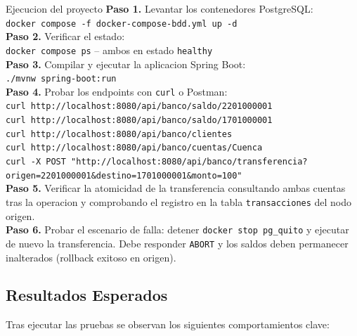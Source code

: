 \documentclass[11pt,a4paper]{article}
\begin{document}
\begin{practicebox}{Ejecucion del proyecto}
\textbf{Paso 1.} Levantar los contenedores PostgreSQL:\\
\texttt{docker compose -f docker-compose-bdd.yml up -d}\\[0.2cm]

\textbf{Paso 2.} Verificar el estado:\\
\texttt{docker compose ps} -- ambos en estado \texttt{healthy}\\[0.2cm]

\textbf{Paso 3.} Compilar y ejecutar la aplicacion Spring Boot:\\
\texttt{./mvnw spring-boot:run}\\[0.2cm]

\textbf{Paso 4.} Probar los endpoints con \texttt{curl} o Postman:\\
\texttt{curl http://localhost:8080/api/banco/saldo/2201000001}\\
\texttt{curl http://localhost:8080/api/banco/saldo/1701000001}\\
\texttt{curl http://localhost:8080/api/banco/clientes}\\
\texttt{curl http://localhost:8080/api/banco/cuentas/Cuenca}\\
\texttt{curl -X POST "http://localhost:8080/api/banco/transferencia?origen=2201000001\&destino=1701000001\&monto=100"}\\[0.2cm]

\textbf{Paso 5.} Verificar la atomicidad de la transferencia consultando ambas cuentas tras la operacion y comprobando el registro en la tabla \texttt{transacciones} del nodo origen.\\[0.2cm]

\textbf{Paso 6.} Probar el escenario de falla: detener \texttt{docker stop pg\_quito} y ejecutar de nuevo la transferencia. Debe responder \texttt{ABORT} y los saldos deben permanecer inalterados (rollback exitoso en origen).
\end{practicebox}

\subsection{Resultados Esperados}

Tras ejecutar las pruebas se observan los siguientes comportamientos clave:
\end{document}

